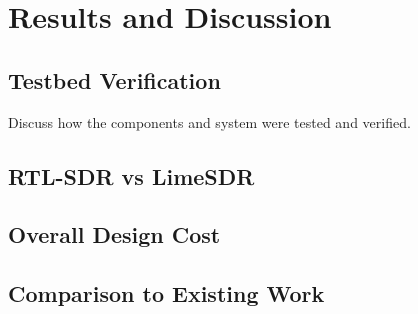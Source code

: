 \chapter{Results and Discussion \label{sec:results}}

\section{Testbed Verification}
Discuss how the components and system were tested and verified.

\section{RTL-SDR vs LimeSDR}


\section{Overall Design Cost}
\section{Comparison to Existing Work}
